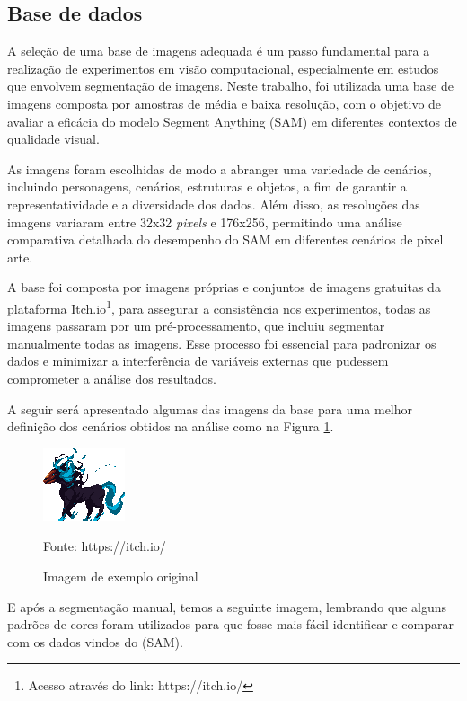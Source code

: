 \subsection{Base de dados}

A seleção de uma base de imagens adequada é um passo fundamental para a realização de experimentos em visão computacional, especialmente em estudos que envolvem segmentação de imagens. Neste trabalho, foi utilizada uma base de imagens composta por amostras de média e baixa resolução, com o objetivo de avaliar a eficácia do modelo Segment Anything (SAM) em diferentes contextos de qualidade visual.

As imagens foram escolhidas de modo a abranger uma variedade de cenários, incluindo personagens, cenários, estruturas e objetos, a fim de garantir a representatividade e a diversidade dos dados. Além disso, as resoluções das imagens variaram entre 32x32 \textit{pixels} e 176x256, permitindo uma análise comparativa detalhada do desempenho do SAM em diferentes cenários de pixel arte.

A base foi composta por imagens próprias e conjuntos de imagens gratuitas da plataforma Itch.io\footnote{Acesso através do link: https://itch.io/}, para assegurar a consistência nos experimentos, todas as imagens passaram por um pré-processamento, que incluiu segmentar manualmente todas as imagens. Esse processo foi essencial para padronizar os dados e minimizar a interferência de variáveis externas que pudessem comprometer a análise dos resultados.

A seguir será apresentado algumas das imagens da base para uma melhor definição dos cenários obtidos na análise como na Figura \ref{fig:base_dados_1}.

\begin{figure}[ht]
    \caption{Imagem de exemplo original}
    \centering
    \includegraphics[scale=2]{imagens/nightmare-idle.png}

    Fonte: https://itch.io/
    \label{fig:base_dados_1}
\end{figure}

E após a segmentação manual, temos a seguinte imagem, lembrando que alguns padrões de cores foram utilizados para que fosse mais fácil identificar e comparar com os dados vindos do (SAM).

